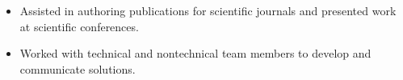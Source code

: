 {\begin{itemize}[noitemsep]
        \item Assisted in authoring publications for scientific journals and presented work at scientific conferences.
        \item Worked with technical and nontechnical team members to develop and communicate solutions.
\end{itemize}
}



